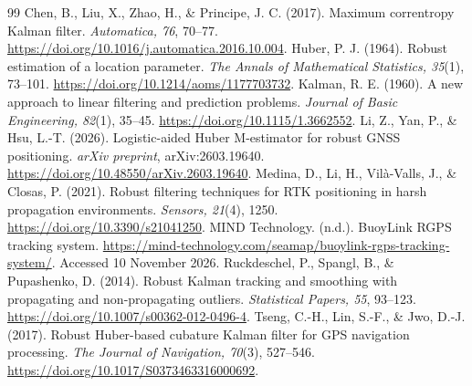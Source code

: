 \documentclass[12pt,a4paper]{article}
\begin{document}
\begin{thebibliography}{99}
\setlength{\itemsep}{0pt}\setlength{\parsep}{0pt}\setlength{\parskip}{0pt}
 Chen, B., Liu, X., Zhao, H., \& Principe, J. C. (2017). Maximum correntropy Kalman filter. \textit{Automatica, 76}, 70--77. \url{https://doi.org/10.1016/j.automatica.2016.10.004}.
 Huber, P. J. (1964). Robust estimation of a location parameter. \textit{The Annals of Mathematical Statistics, 35}(1), 73--101. \url{https://doi.org/10.1214/aoms/1177703732}.
 Kalman, R. E. (1960). A new approach to linear filtering and prediction problems. \textit{Journal of Basic Engineering, 82}(1), 35--45. \url{https://doi.org/10.1115/1.3662552}.
 Li, Z., Yan, P., \& Hsu, L.-T. (2026). Logistic-aided Huber M-estimator for robust GNSS positioning. \textit{arXiv preprint}, arXiv:2603.19640. \url{https://doi.org/10.48550/arXiv.2603.19640}.
 Medina, D., Li, H., Vil\`a-Valls, J., \& Closas, P. (2021). Robust filtering techniques for RTK positioning in harsh propagation environments. \textit{Sensors, 21}(4), 1250. \url{https://doi.org/10.3390/s21041250}.
 MIND Technology. (n.d.). BuoyLink RGPS tracking system. \url{https://mind-technology.com/seamap/buoylink-rgps-tracking-system/}. Accessed 10 November 2026.
 Ruckdeschel, P., Spangl, B., \& Pupashenko, D. (2014). Robust Kalman tracking and smoothing with propagating and non-propagating outliers. \textit{Statistical Papers, 55}, 93--123. \url{https://doi.org/10.1007/s00362-012-0496-4}.
 Tseng, C.-H., Lin, S.-F., \& Jwo, D.-J. (2017). Robust Huber-based cubature Kalman filter for GPS navigation processing. \textit{The Journal of Navigation, 70}(3), 527--546. \url{https://doi.org/10.1017/S0373463316000692}.
\end{thebibliography}
\end{document}
